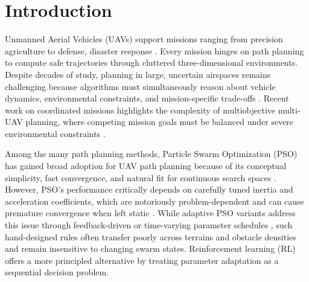 \documentclass[final,5p,times]{elsarticle}
\begin{document}
\section{Introduction}
\label{sec:intro}
Unmanned Aerial Vehicles (UAVs) support missions ranging from precision agriculture to defense, disaster response \cite{Delavarpour2021A, Fascista2022Toward, Alotaibi2019LSAR}.
Every mission hinges on path planning to compute safe trajectories through cluttered three-dimensional environments.
Despite decades of study, planning in large, uncertain airspaces remains challenging because algorithms must simultaneously reason about vehicle dynamics, environmental constraints, and mission-specific trade-offs \cite{AitSaadi2022UAV, Zhou2025A}.
Recent work on coordinated missions highlights the complexity of multiobjective multi-UAV planning, where competing mission goals must be balanced under severe environmental constraints \cite{Meng2025Multiobjective}.

Among the many path planning methods, Particle Swarm Optimization (PSO) \cite{Kennedy1995Particle} has gained broad adoption for UAV path planning because of its conceptual simplicity, fast convergence, and natural fit for continuous search spaces \cite{Cheng2024Research}.
However, PSO's performance critically depends on carefully tuned inertia and acceleration coefficients, which are notoriously problem-dependent and can cause premature convergence when left static \cite{Yang2015Lowdiscrepancy}.
While adaptive PSO variants address this issue through feedback-driven or time-varying parameter schedules \cite{Bansal2011Inertia, Liu2025A}, such hand-designed rules often transfer poorly across terrains and obstacle densities and remain insensitive to changing swarm states.
Reinforcement learning (RL) offers a more principled alternative by treating parameter adaptation as a sequential decision problem.
\end{document}
